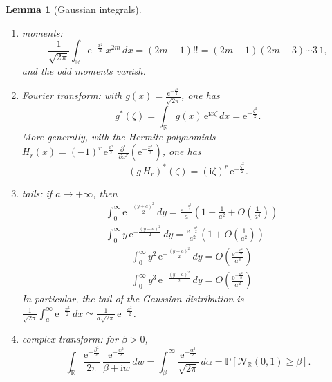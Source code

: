 \documentclass[12pt,a4paper,reqno]{amsart}
\newtheorem{lemma}{Lemma}[section]
\theoremstyle{remark}
\newcommand{\R}{\mathbb{R}}
\newcommand{\E}{\mathrm{e}}
\newcommand{\I}{\mathrm{i}}
\newcommand{\proba}{\mathbb{P}}
\begin{document}
\begin{lemma}[Gaussian integrals]\label{lem:gaussintegral}~
\begin{enumerate}
\item \label{item:gaussmoment} moments: $$\frac{1}{\sqrt{2\pi}}\int_\R \E^{-\frac{x^2}{2}}\,x^{2m}\,dx=(2m-1)!!=(2m-1)(2m-3)\cdots 3\,1,$$ and the odd moments vanish.\vspace{2mm}
\item \label{item:gaussfourier} Fourier transform: with $g(x)=\frac{\E^{-\frac{x^2}{2}}}{\sqrt{2\pi}}$, one has
$$g^*(\zeta)=\int_\R g(x)\,\E^{\I x\zeta}\,dx=\E^{-\frac{\zeta^2}{2}}.$$
More generally, with the Hermite polynomials $H_{r}(x)=(-1)^{r}\,\E^{\frac{x^{2}}{2}}\,\,\frac{\partial^{r}}{\partial x^{r}}(\E^{-\frac{x^{2}}{2}})$, one has
$$(g\,H_{r})^{*}(\zeta)=(\I \zeta)^{r}\,\E^{-\frac{\zeta^{2}}{2}}.$$
\item \label{item:gausstail} tails: if $a \to +\infty$, then
\begin{align*}
&\int_{0}^{\infty} \E^{-\frac{(y+a)^{2}}{2}}\,dy=\frac{\E^{-\frac{a^{2}}{2}}}{a}\left(1-\frac{1}{a^{2}}+O\!\left(\frac{1}{a^{4}}\right)\right)\\
&\int_{0}^{\infty} y\,\E^{-\frac{(y+a)^{2}}{2}}\,dy=\frac{\E^{-\frac{a^{2}}{2}}}{a^{2}}\left(1+O\!\left(\frac{1}{a^{2}}\right)\right)\end{align*}
\begin{align*}
&\int_{0}^{\infty} y^{2}\,\E^{-\frac{(y+a)^{2}}{2}}\,dy=O\!\left(\frac{\E^{-\frac{a^{2}}{2}}}{a^{3}}\right)\\
&\int_{0}^{\infty} y^{3}\,\E^{-\frac{(y+a)^{2}}{2}}\,dy=O\!\left(\frac{\E^{-\frac{a^{2}}{2}}}{a^{2}}\right)
\end{align*}
In particular, the tail of the Gaussian distribution is $\frac{1}{\sqrt{2\pi}}\int_{a}^\infty\E^{-\frac{x^2}{2}}\,dx\simeq\frac{1}{a\sqrt{2\pi}}\,\E^{-\frac{a^2}{2}}$.
\vspace{1mm}
\item \label{item:gausscomplex} complex transform: for $\beta>0$,
$$
\int_{\R}\frac{\E^{-\frac{\beta^{2}}{2}}}{2\pi}\,\frac{\E^{-\frac{w^{2}}{2}}}{\beta+\I w}\,dw=\int_{\beta}^{\infty} \frac{\E^{-\frac{\alpha^{2}}{2}}}{\sqrt{2\pi}}\,d\alpha=\proba[\mathcal{N}_{\R}(0,1)\geq \beta].
$$
\vspace{1mm}
\end{enumerate}
\end{lemma}
\end{document}
